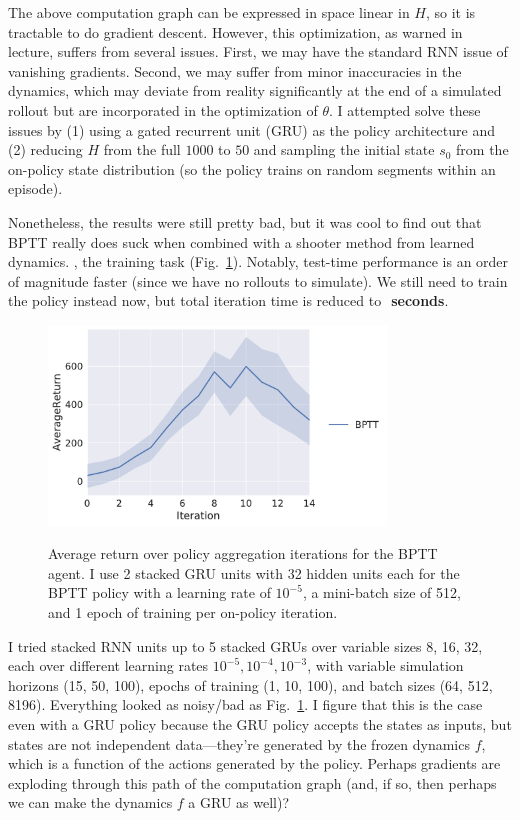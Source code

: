 \documentclass{article}
\begin{document}
The above computation graph can be expressed in space linear in $H$, so it is tractable to do gradient descent. However, this optimization, as warned in lecture, suffers from several issues. First, we may have the standard RNN issue of vanishing gradients. Second, we may suffer from minor inaccuracies in the dynamics, which may deviate from reality significantly at the end of a simulated rollout but are incorporated in the optimization of $\theta$. I attempted solve these issues by (1) using a gated recurrent unit (GRU) as the policy architecture and (2) reducing $H$ from the full $1000$ to $50$ and sampling the initial state $s_0$ from the on-policy state distribution (so the policy trains on random segments within an episode).

Nonetheless, the results were still pretty bad, but it was cool to find out that BPTT really does suck when combined with a shooter method from learned dynamics. ,  the training task (Fig.~\ref{fig:bptt}). Notably, test-time performance is an order of magnitude faster (since we have no rollouts to simulate). We still need to train the policy instead now, but total iteration time is reduced to \textbf{${\mathbf{}}$ seconds}.

\begin{figure}[!h]
  \begin{center}
    {\includegraphics[width=0.8\textwidth]{bptt-AverageReturn.pdf}}
  \end{center}
  \caption{Average return over policy aggregation iterations for the BPTT agent. I use 2 stacked GRU units with 32 hidden units each for the BPTT policy with a learning rate of $10^{-5}$, a mini-batch size of 512, and 1 epoch of training per on-policy iteration.} 
\label{fig:bptt}
\end{figure}

I tried stacked RNN units up to 5 stacked GRUs over variable sizes 8, 16, 32, each over different learning rates $10^{-5},10^{-4},10^{-3}$, with variable simulation horizons (15, 50, 100), epochs of training (1, 10, 100), and batch sizes (64, 512, 8196). Everything looked as noisy/bad as Fig.~\ref{fig:bptt}. I figure that this is the case even with a GRU policy because the GRU policy accepts the states as inputs, but states are not independent data---they're generated by the frozen dynamics $f$, which is a function of the actions generated by the policy. Perhaps gradients are exploding through this path of the computation graph (and, if so, then perhaps we can make the dynamics $f$ a GRU as well)?
\end{document}
